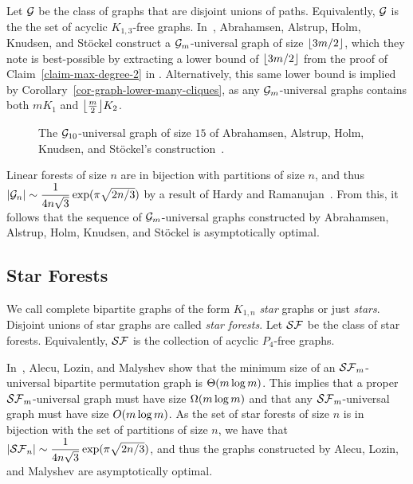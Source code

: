 Let $\mathcal{G}$ be the class of graphs that are disjoint unions of paths. Equivalently, $\mathcal{G}$ is the the set of acyclic $K_{1,3}$-free graphs. In~\cite{abrahamsen:near-optimal-induced-1:}, Abrahamsen, Alstrup, Holm, Knudsen, and St\"ockel construct a $\mathcal{G}_m$-universal graph of size ${\left\lfloor{3m/2}\right\rfloor}$, which they note is best-possible by extracting a lower bound of ${\left\lfloor{3m/2}\right\rfloor}$ from the proof of Claim~\ref{claim-max-degree-2} in \cite{esperet:on-induced-universal:}. Alternatively, this same lower bound is implied by Corollary~\ref{cor-graph-lower-many-cliques}, as any $\mathcal{G}_m$-universal graphs contains both $m K_1$ and ${\left\lfloor{\frac{m}{2}}\right\rfloor} K_2$.

\begin{figure}[ht]
\captionsetup{justification=centering, margin=1in}
\caption{The $\mathcal{G}_{10}$-universal graph of size $15$ of Abrahamsen, Alstrup, Holm, Knudsen, and St\"ockel's construction~\cite{abrahamsen:near-optimal-induced-1:}.}
\end{figure}

Linear forests of size $n$ are in bijection with partitions of size $n$, and thus $\left\lvert{ \mathcal{G}_n}\right\rvert \sim \dfrac{1}{4n\sqrt{3}} \exp(\pi \sqrt{2n/3})$ by a result of Hardy and Ramanujan~\cite{hardy:asymptotic-formulae:}. From this, it follows that the sequence of $\mathcal{G}_m$-universal graphs constructed by Abrahamsen, Alstrup, Holm, Knudsen, and St\"ockel is asymptotically optimal. 

\subsection{Star Forests}

We call complete bipartite graphs of the form $K_{1,n}$ \emph{star} graphs or just \emph{stars}. Disjoint unions of star graphs are called \emph{star forests}. Let $\mathcal{SF}$ be the class of star forests. Equivalently, $\mathcal{SF}$ is the collection of acyclic $P_4$-free graphs. 

In~\cite{alecu:critical-properties:}, Alecu, Lozin, and Malyshev show that the minimum size of an $\mathcal{SF}_m$-universal bipartite permutation graph is $\Theta{\left(m \log m\right)}$. This implies that a proper $\mathcal{SF}_m$-universal graph must have size $\Omega{\left(m \log m\right)}$ and that any $\mathcal{SF}_m$-universal graph must have size $O{\left(m \log m\right)}$. As the set of star forests of size $n$ is in bijection with the set of partitions of size $n$, we have that $\left\lvert{\mathcal{SF}_n}\right\rvert \sim \dfrac{1}{4n\sqrt{3}} \exp(\pi \sqrt{2n/3})$, and thus the graphs constructed by Alecu, Lozin, and Malyshev are asymptotically optimal.

